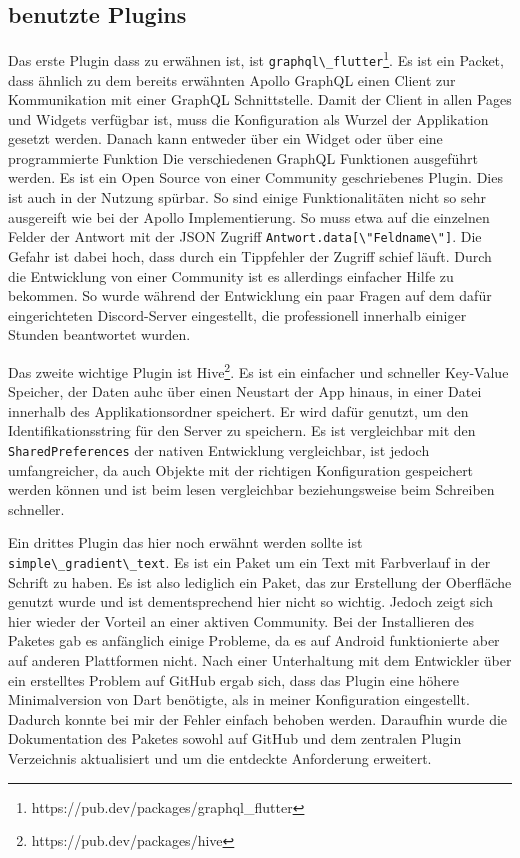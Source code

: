 \subsection{benutzte Plugins}
Das erste Plugin dass zu erwähnen ist, ist \verb|graphql\_flutter|\footnote{https://pub.dev/packages/graphql\_flutter}. Es ist ein Packet, dass ähnlich zu dem bereits erwähnten Apollo GraphQL einen Client zur Kommunikation mit einer GraphQL Schnittstelle. Damit der Client in allen Pages und Widgets verfügbar ist, muss die Konfiguration als Wurzel der Applikation gesetzt werden. Danach kann entweder über ein Widget oder über eine programmierte Funktion Die verschiedenen GraphQL Funktionen ausgeführt werden. Es ist ein Open Source von einer Community geschriebenes Plugin. Dies ist auch in der Nutzung spürbar. So sind einige Funktionalitäten nicht so sehr ausgereift wie bei der Apollo Implementierung. So muss etwa auf die einzelnen Felder der Antwort mit der JSON Zugriff \verb|Antwort.data[\"Feldname\"]|. Die Gefahr ist dabei hoch, dass durch ein Tippfehler der Zugriff schief läuft. Durch die Entwicklung von einer Community ist es allerdings einfacher Hilfe zu bekommen. So wurde während der Entwicklung ein paar Fragen auf dem dafür eingerichteten Discord-Server eingestellt, die professionell innerhalb einiger Stunden beantwortet wurden.

Das zweite wichtige Plugin ist Hive\footnote{https://pub.dev/packages/hive}. Es ist ein einfacher und schneller Key-Value Speicher, der Daten auhc über einen Neustart der App hinaus, in einer Datei innerhalb des Applikationsordner speichert. Er wird dafür genutzt, um den Identifikationsstring für den Server zu speichern. Es ist vergleichbar mit den \verb|SharedPreferences| der nativen Entwicklung vergleichbar, ist jedoch umfangreicher, da auch Objekte mit der richtigen Konfiguration gespeichert werden können und ist beim lesen vergleichbar beziehungsweise beim Schreiben schneller.

Ein drittes Plugin das hier noch erwähnt werden sollte ist \verb|simple\_gradient\_text|. Es ist ein Paket um ein Text mit Farbverlauf in der Schrift zu haben. Es ist also lediglich ein Paket, das zur Erstellung der Oberfläche genutzt wurde und ist dementsprechend hier nicht so wichtig. Jedoch zeigt sich hier wieder der Vorteil an einer aktiven Community. Bei der Installieren des Paketes gab es anfänglich einige Probleme, da es auf Android funktionierte aber auf anderen Plattformen nicht. Nach einer Unterhaltung mit dem Entwickler über ein erstelltes Problem auf GitHub ergab sich, dass das Plugin eine höhere Minimalversion von Dart benötigte, als in meiner Konfiguration eingestellt. Dadurch konnte bei mir der Fehler einfach behoben werden. Daraufhin wurde die Dokumentation des Paketes sowohl auf GitHub und dem zentralen Plugin Verzeichnis aktualisiert und um die entdeckte Anforderung erweitert.

